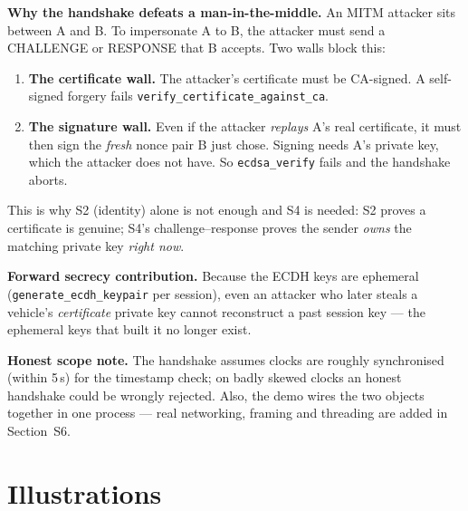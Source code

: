\documentclass[11pt,a4paper]{article}
\begin{document}
\noindent\textbf{Why the handshake defeats a man-in-the-middle.} An MITM attacker
sits between A and B. To impersonate A to B, the attacker must send a CHALLENGE
or RESPONSE that B accepts. Two walls block this:
\begin{enumerate}
  \item \textbf{The certificate wall.} The attacker's certificate must be
        CA-signed. A self-signed forgery fails
        \texttt{verify\_certificate\_against\_ca}.
  \item \textbf{The signature wall.} Even if the attacker \emph{replays} A's real
        certificate, it must then sign the \emph{fresh} nonce pair B just chose.
        Signing needs A's private key, which the attacker does not have. So
        \texttt{ecdsa\_verify} fails and the handshake aborts.
\end{enumerate}
This is why S2 (identity) alone is not enough and S4 is needed: S2 proves a
certificate is genuine; S4's challenge--response proves the sender \emph{owns}
the matching private key \emph{right now}.

\textbf{Forward secrecy contribution.} Because the ECDH keys are ephemeral
(\texttt{generate\_ecdh\_keypair} per session), even an attacker who later steals
a vehicle's \emph{certificate} private key cannot reconstruct a past session key
--- the ephemeral keys that built it no longer exist.

\textbf{Honest scope note.} The handshake assumes clocks are roughly
synchronised (within 5\,s) for the timestamp check; on badly skewed clocks an
honest handshake could be wrongly rejected. Also, the demo wires the two objects
together in one process --- real networking, framing and threading are added in
Section~S6.

\section{Illustrations}
\end{document}
